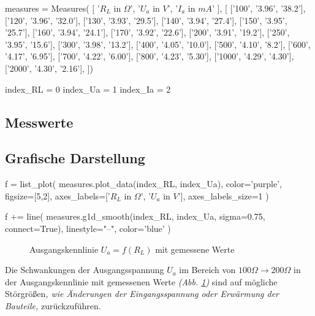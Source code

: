 \documentclass[a4paper]{hitec}
\begin{document}
\begin{sagesilent}
    measures = Measures(
        [
            '$R_L$ in $\Omega$',
            '$U_a$ in $V$', 
            '$I_a$ in $mA$'
        ], [
            ['100', '3.96', '38.2'],
            ['120', '3.96', '32.0'],
            ['130', '3.93', '29.5'],
            ['140', '3.94', '27.4'],
            ['150', '3.95', '25.7'],
            ['160', '3.94', '24.1'],
            ['170', '3.92', '22.6'],
            ['200', '3.91', '19.2'],
            ['250', '3.95', '15.6'],
            ['300', '3.98', '13.2'],
            ['400', '4.05', '10.0'],
            ['500', '4.10', '8.2'],
            ['600', '4.17', '6.95'],
            ['700', '4.22', '6.00'],
            ['800', '4.23', '5.30'],
            ['1000', '4.29', '4.30'],
            ['2000', '4.30', '2.16'],
    ])

    index_RL = 0
    index_Ua = 1
    index_Ia = 2
\end{sagesilent}

\subsection{Messwerte}

\begin{center}
    \renewcommand{\arraystretch}{1.2}
\end{center}

\subsection{Grafische Darstellung}

\begin{sagesilent}
    f = list_plot(
        measures.plot_data(index_RL, index_Ua),
        color='purple',
        figsize=[5,2],
        axes_labels=['$R_L$ in $\Omega$', '$U_a$ in $V$'],
        axes_labels_size=1
    )

    f += line(
        measures.g1d_smooth(index_RL, index_Ua, sigma=0.75, connect=True),
        linestyle="--",
        color='blue'
    )
\end{sagesilent}

\begin{figure}[H]
    \centering
    \caption{Ausgangskennlinie \textbf{$U_a = f(R_L)$} mit gemessene Werte}
    \label{fig:measure}
\end{figure}

Die Schwankungen der Ausgangsspannung $U_a$ im Bereich von $100\Omega \to 200\Omega$ in der Ausgangskennlinie mit gemessenen Werte \textit{(Abb. \ref{fig:measure})} sind auf mögliche Störgrößen\textit{, wie Änderungen der Eingangsspannung oder Erwärmung der Bauteile,} zurückzuführen.
\end{document}
